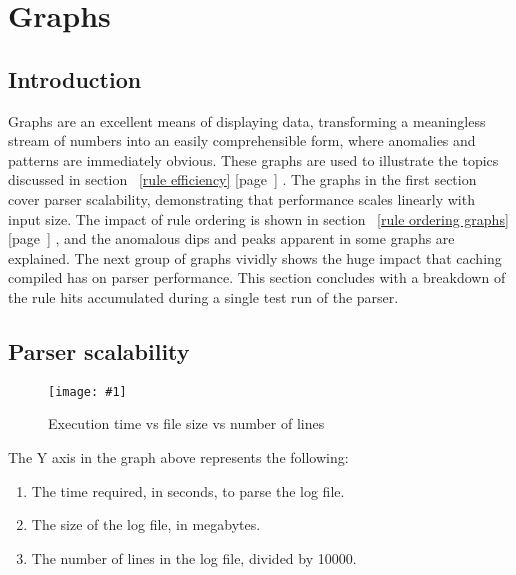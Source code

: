 \documentclass[a4paper,12pt,draft]{article}
\newcommand{\showgraph}[3]{
    \begin{figure}[hbt!]
        \caption{#2}\label{#3}
        \texttt{[image: \#1]}
    \end{figure}
}
\newcommand{\refwithpage}[1]{%
    \empty{}\ref{#1} [page~\pageref{#1}]%
}
\begin{document}


\label{bibliography}

\section{Graphs}

\label{graphs}

\renewcommand{\figurename}{Graph}

\subsection{Introduction}

Graphs are an excellent means of displaying data, transforming a
meaningless stream of numbers into an easily comprehensible form, where
anomalies and patterns are immediately obvious.  These graphs are used to
illustrate the topics discussed in section~\refwithpage{rule efficiency}.
The graphs in the first section cover parser scalability, demonstrating
that performance scales linearly with input size.  The impact of rule
ordering is shown in section~\refwithpage{rule ordering graphs}, and the
anomalous dips and peaks apparent in some graphs are explained.  The next
group of graphs vividly shows the huge impact that caching compiled
\regexs{} has on parser performance.  This section concludes with a
breakdown of the rule hits accumulated during a single test run of the
parser.

\subsection{Parser scalability}

\showgraph{build/plot-normal-filesize-numlines.ps}{Execution time vs file
size vs number of lines}{execution time vs file size vs number of lines
graph}

The Y axis in the graph above represents the following:

\begin{enumerate}

    \item The time required, in seconds, to parse the log file.

    \item The size of the log file, in megabytes.

    \item The number of lines in the log file, divided by 10000.

\end{enumerate}
\end{document}
